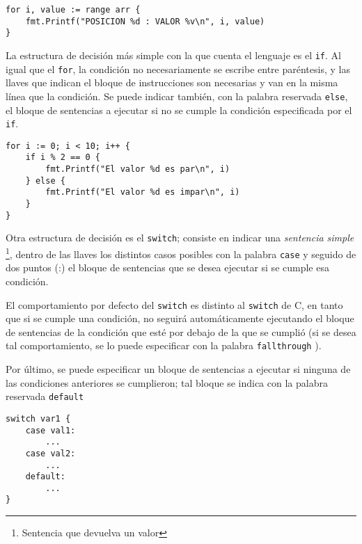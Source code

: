 \vspace*{5mm}
\begin{lstlisting}[title=Iterando sobre un arreglo con \texttt{range}]
for i, value := range arr {
    fmt.Printf("POSICION %d : VALOR %v\n", i, value)
} 
\end{lstlisting}

La estructura de decisión más simple con la que cuenta el lenguaje es el \texttt{if}. Al igual que el \texttt{for}, la condición no necesariamente se escribe entre paréntesis, y las llaves que indican el bloque de instrucciones son necesarias y van en la misma línea que la condición. Se puede indicar también, con la palabra reservada \texttt{else}, el bloque de sentencias a ejecutar si no se cumple la condición especificada por el \texttt{if}.  

\vspace*{5mm}
\begin{lstlisting}[title={\centering Ejemplo de un \texttt{for}, un \texttt{if..else}, y operaciones aritméticas}]
for i := 0; i < 10; i++ {
    if i % 2 == 0 {
        fmt.Printf("El valor %d es par\n", i)
    } else {
        fmt.Printf("El valor %d es impar\n", i)
    }
}
\end{lstlisting}

Otra estructura de decisión es el \texttt{switch}; consiste en indicar una \emph{sentencia simple} \footnote{Sentencia que devuelva un valor}, dentro de las llaves los distintos casos posibles con la palabra \texttt{case} y seguido de dos puntos (:) el bloque de sentencias que se desea ejecutar si se cumple esa condición. 

El comportamiento por defecto del \texttt{switch} es distinto al \texttt{switch} de C, en tanto que si se cumple una condición, no seguirá automáticamente ejecutando el bloque de sentencias de la condición que esté por debajo de la que se cumplió (si se desea tal comportamiento, se lo puede especificar con la palabra \texttt{fallthrough} \autocite{TheWayToGo:ControlStructures}).

Por último, se puede especificar un bloque de sentencias a ejecutar si ninguna de las condiciones anteriores se cumplieron; tal bloque se indica con la palabra reservada \texttt{default} 

\begin{lstlisting}[title=Estructura de decisión múltiple \texttt{switch}]
switch var1 {
    case val1:
        ...
    case val2:
        ...
    default:
        ...
}
\end{lstlisting}


